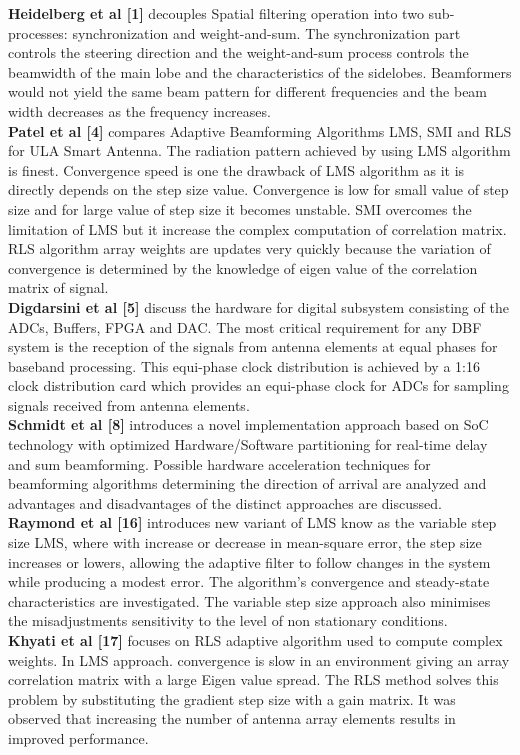 \textbf{Heidelberg et al [1]} decouples Spatial filtering operation into two sub-processes: synchronization and weight-and-sum. The synchronization part controls the steering direction and the weight-and-sum process controls the beamwidth of the main lobe and the characteristics of the sidelobes. Beamformers would not yield the same beam pattern for different frequencies and the beam width decreases as the frequency increases.\\
\textbf{Patel et al [4]} compares Adaptive Beamforming Algorithms LMS, SMI and RLS for ULA Smart Antenna. The radiation pattern achieved by using LMS algorithm is finest. Convergence speed is one the drawback of LMS algorithm as it is directly depends on the step size value. Convergence is low for small value of step size and for large value of step size it becomes unstable. SMI overcomes the limitation of LMS but it increase the complex computation of correlation matrix. RLS algorithm array weights are updates very quickly because the variation of convergence is determined by the knowledge of eigen value of the correlation matrix of signal.\\ 
\textbf{Digdarsini et al [5]} discuss the hardware for digital subsystem consisting of the ADCs, Buffers, FPGA and DAC. The most critical requirement for any DBF system is the reception of the signals from antenna elements at equal phases for baseband processing. This equi-phase clock distribution is achieved by a 1:16 clock distribution card which provides an equi-phase clock for ADCs for sampling signals received from antenna elements.\\
\textbf{Schmidt et al [8]} introduces a novel implementation approach based on SoC technology with optimized Hardware/Software partitioning for real-time delay and sum beamforming. Possible hardware acceleration techniques for beamforming algorithms determining the direction of arrival are analyzed and advantages and disadvantages of the distinct approaches are discussed.\\
\textbf{Raymond et al [16]} introduces new variant of LMS know as the variable step size LMS, where with increase or decrease in mean-square error, the step size increases or lowers, allowing the adaptive filter to follow changes in the system while producing a modest error. The algorithm’s convergence and steady-state characteristics are investigated. The variable step size approach also minimises the misadjustments sensitivity to the level of non stationary conditions.\\
\textbf{Khyati et al [17]} focuses on RLS adaptive algorithm used to compute complex weights. In LMS approach. convergence is slow in an environment giving an array correlation matrix with a large Eigen value spread. The RLS method solves this problem by substituting the gradient step size with a gain matrix. It was observed that increasing the number of antenna array elements results in improved performance.\\ 
